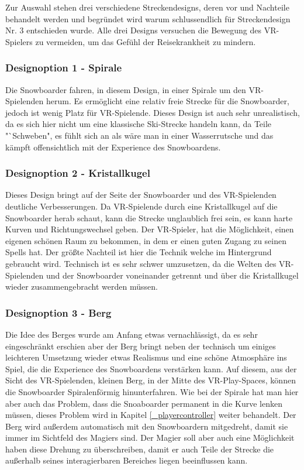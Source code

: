Zur Auswahl stehen drei verschiedene Streckendesigns, deren vor und Nachteile behandelt werden und begründet wird warum schlussendlich für Streckendesign Nr. 3 entschieden wurde. Alle drei Designs versuchen die Bewegung des VR-Spielers zu vermeiden, um das Gefühl der Reisekrankheit zu mindern.

\subsubsection{Designoption 1 - Spirale}

Die Snowboarder fahren, in diesem Design, in einer Spirale um den VR-Spielenden herum. Es ermöglicht eine relativ freie Strecke für die Snowboarder, jedoch ist wenig Platz für VR-Spielende. Dieses Design ist auch sehr unrealistisch, da es sich hier nicht um eine klassische Ski-Strecke handeln kann, da Teile "`Schweben", es fühlt sich an als wäre man in einer Wasserrutsche und das kämpft offensichtlich mit der Experience des Snowboardens.

\subsubsection{Designoption 2 - Kristallkugel}

Dieses Design bringt auf der Seite der Snowboarder und des VR-Spielenden deutliche Verbesserungen. Da VR-Spielende durch eine Kristallkugel auf die Snowboarder herab schaut, kann die Strecke unglaublich frei sein, es kann harte Kurven und Richtungswechsel geben. Der VR-Spieler, hat die Möglichkeit, einen eigenen schönen Raum zu bekommen, in dem er einen guten Zugang zu seinen Spells hat. Der größte Nachteil ist hier die Technik welche im Hintergrund gebraucht wird. Technisch ist es sehr schwer umzusetzen, da die Welten des VR-Spielenden und der Snowboarder voneinander getrennt und über die Kristallkugel wieder zusammengebracht werden müssen.

\subsubsection{Designoption 3 - Berg}

Die Idee des Berges wurde am Anfang etwas vernachlässigt, da es sehr eingeschränkt erschien aber der Berg bringt neben der technisch um einiges leichteren Umsetzung wieder etwas Realismus und eine schöne Atmosphäre ins Spiel, die die Experience des Snowboardens verstärken kann. Auf diesem, aus der Sicht des VR-Spielenden, kleinen Berg, in der Mitte des VR-Play-Spaces, können die Snowboarder Spiralenförmig hinunterfahren. Wie bei der Spirale hat man hier aber auch das Problem, dass die Snoaboarder permanent in die Kurve lenken müssen, dieses Problem wird in Kapitel \ref{_playercontroller} weiter behandelt. Der Berg wird außerdem automatisch mit den Snowboardern mitgedreht, damit sie immer im Sichtfeld des Magiers sind. Der Magier soll aber auch eine Möglichkeit haben diese Drehung zu überschreiben, damit er auch Teile der Strecke die außerhalb seines interagierbaren Bereiches liegen beeinflussen kann.

